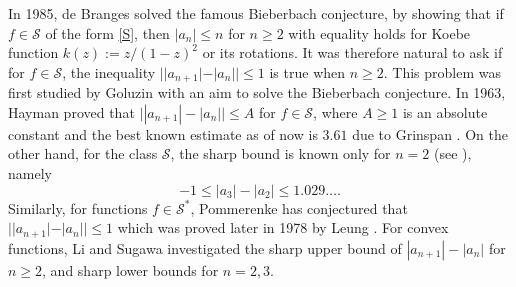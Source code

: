 \documentclass[a4paper,12pt]{amsart}
\theoremstyle{definition}
\numberwithin{equation}{section}
\begin{document}
In 1985, de Branges \cite{DeB} solved the famous Bieberbach conjecture, by showing that if $f \in \mathcal{S}$ of the form \eqref{S}, then $|a_n| \le n$ for $n \geq 2$ with equality holds for Koebe function $k(z):=z/(1-z)^2$ or its rotations. It was therefore natural to ask if for $f \in \mathcal{S}$, the inequality $||a_{n+1}| -|a_n|| \leq 1$
is true when $n \geq 2$. This problem was first studied
by Goluzin \cite{Gol46} with an aim to solve the Bieberbach conjecture. In 1963, Hayman \cite{Hay63} proved that $\big||a_{n+1}|-|a_n|\big |\le A$ for $f \in \mathcal{S}$, where $A \ge 1$
is an absolute constant and the best known estimate as of now is $3.61$ due to Grinspan \cite{Gri76}. On the other hand, for the class $\mathcal{S}$, the sharp bound is known only for $n=2$ (see \cite[Theorem~3.11]{Dur83}), namely
$$
-1\leq|a_3|-|a_2|\leq 1.029\ldots.
$$
Similarly, for functions
$f \in \mathcal{S}^*$, Pommerenke \cite{pom} has conjectured that $||a_{n+1}| - |a_n|| \leq 1$ which was proved later in 1978 by Leung \cite{leung}. For convex functions, Li and Sugawa \cite{LS17}  investigated the sharp upper bound of $|a_{n+1}|-|a_n|$ for $n\ge 2$, and sharp lower bounds for $n=2,3$. 

\medskip
\end{document}
